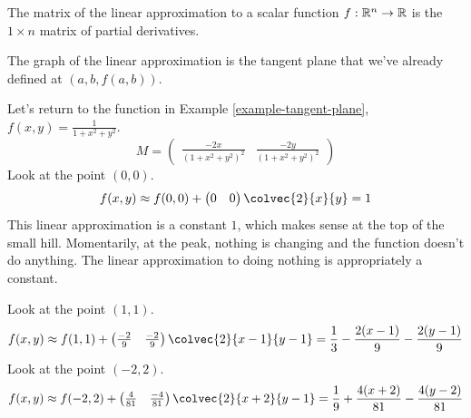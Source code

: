 \documentclass[fleqn,letterpaper]{report}
\begin{document}
\begin{defn}
The matrix of the linear approximation to a scalar function
$f: \mathbb{R}^n \rightarrow \mathbb{R}$ is the $1 \times n$ matrix of
partial derivatives. 
\end{defn}
The graph of the linear approximation is the tangent plane that
we've already defined at $(a,b,f(a,b))$. 

\begin{example}
Let's return to the function in Example
\ref{example-tangent-plane}, $f(x,y) = \frac{1}{1 + x^2 + y^2}$.
\begin{equation*}
M = \left( \begin{matrix} \frac{-2x}{(1+x^2+y^2)^2} &
\frac{-2y}{(1+x^2+y^2)^2} \end{matrix} \right) 
\end{equation*}
Look at the point $(0,0)$.
\begin{equation*}
f(x,y) \approx f(0,0) + \left( \begin{matrix} 0 & 0
\end{matrix} \right) \colvec{2}{x}{y} = 1
\end{equation*}
This linear approximation is a constant $1$, which makes sense
at the top of the small hill. Momentarily, at the peak,
nothing is changing and the function doesn't do anything. The
linear approximation to doing nothing is appropriately a
constant.

Look at the point $(1,1)$.
\begin{equation*}
f(x,y) \approx f(1,1) + \left( \begin{matrix} \frac{-2}{9} &
\frac{-2}{9} \end{matrix} \right) \colvec{2}{x-1}{y-1} = \frac{1}{3}
- \frac{2(x-1)}{9} - \frac{2(y-1)}{9} 
\end{equation*}
Look at the point $(-2,2)$.
\begin{equation*}
f(x,y) \approx f(-2,2) + \left( \begin{matrix} \frac{4}{81} &
\frac{-4}{81} \end{matrix} \right) \colvec{2}{x+2}{y-1} = \frac{1}{9}
+ \frac{4(x+2)}{81} - \frac{4(y-2)}{81} 
\end{equation*}
\end{example}
\end{document}
